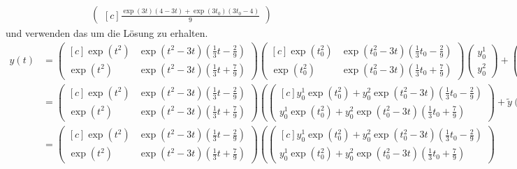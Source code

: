 \begin{solution}
\begin{align*}
\begin{pmatrix*}[c]
      \frac{\exp(3t)(4 - 3t) + \exp(3t_0)(3t_0 - 4)}{9}
    \end{pmatrix*}
\end{align*}
und verwenden das um die Lösung zu erhalten.
\begin{align*}
  y(t) &= \begin{pmatrix*}[c]
    \exp(t^2) & \exp(t^2-3t)(\frac{1}{3}t - \frac{2}{9}) \\
    \exp(t^2) & \exp(t^2-3t)(\frac{1}{3}t + \frac{7}{9})
  \end{pmatrix*}
  \begin{pmatrix*}[c]
    \exp(t_0^2) & \exp(t_0^2-3t)(\frac{1}{3}t_0 - \frac{2}{9}) \\
    \exp(t_0^2) & \exp(t_0^2-3t)(\frac{1}{3}t_0 + \frac{7}{9})
  \end{pmatrix*}
  \begin{pmatrix}
    y_0^1 \\ y_0^2
  \end{pmatrix} 
  + 
  \begin{pmatrix*}[c]
    \exp(t^2) & \exp(t^2-3t)(\frac{1}{3}t - \frac{2}{9}) \\
    \exp(t^2) & \exp(t^2-3t)(\frac{1}{3}t + \frac{7}{9})
  \end{pmatrix*} 
  \tilde{y}(t) \\
    &= 
  \begin{pmatrix*}[c]
    \exp(t^2) & \exp(t^2-3t)(\frac{1}{3}t - \frac{2}{9}) \\
    \exp(t^2) & \exp(t^2-3t)(\frac{1}{3}t + \frac{7}{9})
  \end{pmatrix*}
    \left( \begin{pmatrix*}[c]
        y_0^1\exp(t_0^2) + y_0^2\exp(t_0^2-3t)(\frac{1}{3}t_0 - \frac{2}{9}) \\
        y_0^1\exp(t_0^2) + y_0^2\exp(t_0^2-3t)(\frac{1}{3}t_0 + \frac{7}{9})
      \end{pmatrix*} 
      + \tilde{y}(t) \right) \\
      &= \begin{pmatrix*}[c]
        \exp(t^2) & \exp(t^2-3t)(\frac{1}{3}t - \frac{2}{9}) \\
        \exp(t^2) & \exp(t^2-3t)(\frac{1}{3}t + \frac{7}{9})
      \end{pmatrix*}
      \left(\begin{pmatrix*}[c]
          y_0^1\exp(t_0^2) + y_0^2\exp(t_0^2-3t)(\frac{1}{3}t_0 - \frac{2}{9}) \\
          y_0^1\exp(t_0^2) + y_0^2\exp(t_0^2-3t)(\frac{1}{3}t_0 + \frac{7}{9})

\end{pmatrix*}
\end{align*}
\end{solution}
